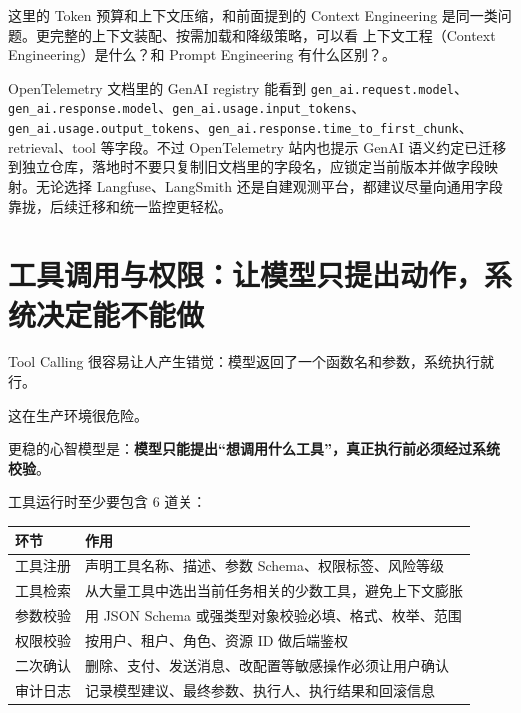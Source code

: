 \documentclass[9pt,a4paper,twocolumn]{ctexart}
\begin{document}
这里的 Token 预算和上下文压缩，和前面提到的 Context Engineering 是同一类问题。更完整的上下文装配、按需加载和降级策略，可以看 上下文工程（Context Engineering）是什么？和 Prompt Engineering 有什么区别？。



OpenTelemetry 文档里的 GenAI registry 能看到 \texttt{gen\_ai.request.model}、\texttt{gen\_ai.response.model}、\texttt{gen\_ai.usage.input\_tokens}、\texttt{gen\_ai.usage.output\_tokens}、\texttt{gen\_ai.response.time\_to\_first\_chunk}、retrieval、tool 等字段。不过 OpenTelemetry 站内也提示 GenAI 语义约定已迁移到独立仓库，落地时不要只复制旧文档里的字段名，应锁定当前版本并做字段映射。无论选择 Langfuse、LangSmith 还是自建观测平台，都建议尽量向通用字段靠拢，后续迁移和统一监控更轻松。



\section*{工具调用与权限：让模型只提出动作，系统决定能不能做}


Tool Calling 很容易让人产生错觉：模型返回了一个函数名和参数，系统执行就行。



这在生产环境很危险。



更稳的心智模型是：\textbf{模型只能提出“想调用什么工具”，真正执行前必须经过系统校验}。



工具运行时至少要包含 6 道关：


{\footnotesize
\begin{tabular}{|p{}|p{}|}
\hline
\textbf{环节} & \textbf{作用} \\
\hline
工具注册 & 声明工具名称、描述、参数 Schema、权限标签、风险等级 \\
\hline
工具检索 & 从大量工具中选出当前任务相关的少数工具，避免上下文膨胀 \\
\hline
参数校验 & 用 JSON Schema 或强类型对象校验必填、格式、枚举、范围 \\
\hline
权限校验 & 按用户、租户、角色、资源 ID 做后端鉴权 \\
\hline
二次确认 & 删除、支付、发送消息、改配置等敏感操作必须让用户确认 \\
\hline
审计日志 & 记录模型建议、最终参数、执行人、执行结果和回滚信息 \\
\hline
\end{tabular}
}
\end{document}
